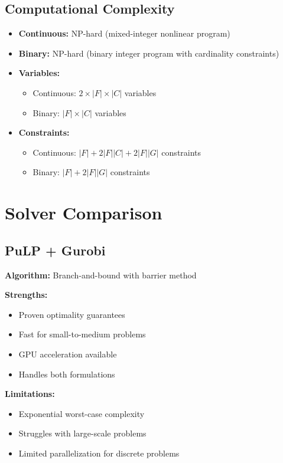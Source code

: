 \documentclass{article}
\begin{document}
\subsection{Computational Complexity}

\begin{itemize}
    \item \textbf{Continuous:} NP-hard (mixed-integer nonlinear program)
    \item \textbf{Binary:} NP-hard (binary integer program with cardinality constraints)
    \item \textbf{Variables:}
    \begin{itemize}
        \item Continuous: $2 \times |F| \times |C|$ variables
        \item Binary: $|F| \times |C|$ variables
    \end{itemize}
    \item \textbf{Constraints:}
    \begin{itemize}
        \item Continuous: $|F| + 2|F||C| + 2|F||G|$ constraints
        \item Binary: $|F| + 2|F||G|$ constraints
    \end{itemize}
\end{itemize}

\section{Solver Comparison}

\subsection{PuLP + Gurobi}

\textbf{Algorithm:} Branch-and-bound with barrier method

\textbf{Strengths:}
\begin{itemize}
    \item Proven optimality guarantees
    \item Fast for small-to-medium problems
    \item GPU acceleration available
    \item Handles both formulations
\end{itemize}

\textbf{Limitations:}
\begin{itemize}
    \item Exponential worst-case complexity
    \item Struggles with large-scale problems
    \item Limited parallelization for discrete problems
\end{itemize}
\end{document}

